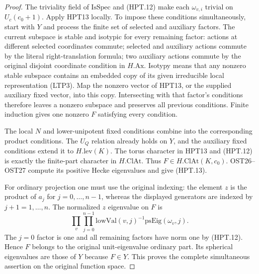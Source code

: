 \begin{proof}
The triviality field of $\mathrm{IsSpec}$ and (HPT.12) make each
$\omega_{v,i}$ trivial on $U_c(c_0+1)$.  Apply HPT13 locally.
To impose these conditions simultaneously, start with $Y$ and
process the finite set of selected and auxiliary factors.  The
current subspace is stable and isotypic for every remaining factor:
actions at different selected coordinates commute; selected and
auxiliary actions commute by the literal right-translation
formula; two auxiliary actions commute by the original disjoint
coordinate condition in $H.\mathrm{Ax}$.  Isotypy means that any
nonzero stable subspace contains an embedded copy of its given
irreducible local representation (LTP3).  Map the nonzero vector
of HPT13, or the supplied auxiliary fixed vector, into this copy.
Intersecting with that factor's conditions therefore leaves a
nonzero subspace and preserves all previous conditions.  Finite
induction gives one nonzero $F$ satisfying every condition.

The local $N$ and lower-unipotent fixed conditions combine into
the corresponding product conditions.  The $U_Q$ relation already
holds on $Y$, and the auxiliary fixed conditions extend it to
$H.\mathrm{lev}(K)$.  The torus character in HPT13 and (HPT.12)
is exactly the finite-part character in $H.\mathrm{ClAt}$.
Thus $F\in H.\mathrm{ClAt}(K,c_0)$.  OST26--OST27 compute its
positive Hecke eigenvalues and give (HPT.13).

For ordinary projection one must use the original indexing:
the element $z$ is the product of $a_j$ for $j=0,\ldots,n-1$,
whereas the displayed generators are indexed by $j+1=1,\ldots,n$.
The normalized $z$ eigenvalue on $F$ is
\[
              \prod_v\prod_{j=0}^{n-1}
                  \mathrm{lowVal}(v,j)^{-1}\mathrm{psEig}(\omega_v,j).
\]
The $j=0$ factor is one and all remaining factors have norm one
by (HPT.12).  Hence $F$ belongs to the original unit-eigenvalue
ordinary part.  Its spherical eigenvalues are those of $Y$
because $F\in Y$.  This proves the complete simultaneous assertion
on the original function space.
\end{proof}

